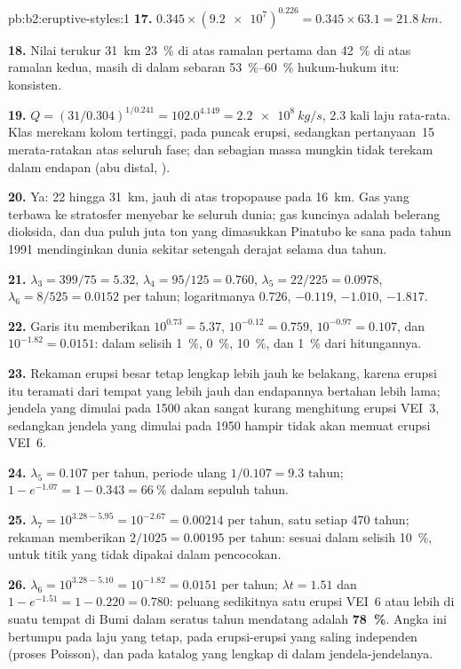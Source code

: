 \begin{solution}{pb:b2:eruptive-styles:1}
\textbf{17.} $0.345\times(\num{9.2e7})^{0.226} = 0.345\times63.1 = \qty{21.8}{km}$.

\textbf{18.} Nilai terukur \qty{31}{km} \qty{23}{\percent} di atas ramalan
pertama dan \qty{42}{\percent} di atas ramalan kedua, masih di dalam sebaran
\qtyrange{53}{60}{\percent} hukum-hukum itu: konsisten.

\textbf{19.} $Q = (31/0.304)^{1/0.241} = 102.0^{4.149} = \qty{2.2e8}{kg/s}$, 2.3 kali
laju rata-rata. Klas merekam kolom tertinggi, pada puncak
erupsi, sedangkan pertanyaan~15 merata-ratakan atas seluruh fase; dan sebagian massa
mungkin tidak terekam dalam endapan (abu distal, ).

\textbf{20.} Ya: 22 hingga \qty{31}{km}, jauh di atas tropopause pada \qty{16}{km}.
Gas yang terbawa ke stratosfer menyebar ke seluruh dunia; gas kuncinya adalah
belerang dioksida, dan dua puluh juta ton yang dimasukkan Pinatubo ke sana pada tahun 1991
mendinginkan dunia sekitar setengah derajat selama dua tahun.

\textbf{21.} $\lambda_3 = 399/75 = 5.32$, $\lambda_4 = 95/125 = 0.760$, $\lambda_5 = 22/225 =
0.0978$, $\lambda_6 = 8/525 = 0.0152$ per tahun; logaritmanya $0.726$, $-0.119$, $-1.010$,
$-1.817$.

\textbf{22.} Garis itu memberikan $10^{0.73} = 5.37$, $10^{-0.12} = 0.759$, $10^{-0.97} =
0.107$, dan $10^{-1.82} = 0.0151$: dalam selisih \qty{1}{\percent}, \qty{0}{\percent},
\qty{10}{\percent}, dan \qty{1}{\percent} dari hitungannya.

\textbf{23.} Rekaman erupsi besar tetap lengkap lebih jauh ke belakang,
karena erupsi itu teramati dari tempat yang lebih jauh dan endapannya bertahan lebih lama; jendela
yang dimulai pada 1500 akan sangat kurang menghitung erupsi VEI~3, sedangkan jendela
yang dimulai pada 1950 hampir tidak akan memuat erupsi VEI~6.

\textbf{24.} $\lambda_5 = \num{0.107}$ per tahun, periode ulang $1/0.107 =
\num{9.3}\text{ tahun}$; $1 - e^{-1.07} = 1 - 0.343 = \qty{66}{\percent}$ dalam sepuluh tahun.

\textbf{25.} $\lambda_7 = 10^{3.28 - 5.95} = 10^{-2.67} = 0.00214$ per tahun, satu setiap
470 tahun; rekaman memberikan $2/1025 = 0.00195$ per tahun: sesuai dalam selisih
\qty{10}{\percent}, untuk titik yang tidak dipakai dalam pencocokan.

\textbf{26.} $\lambda_6 = 10^{3.28 - 5.10} = 10^{-1.82} = 0.0151$ per tahun; $\lambda t = 1.51$
dan $1 - e^{-1.51} = 1 - 0.220 = 0.780$: peluang sedikitnya satu erupsi
VEI~6 atau lebih di suatu tempat di Bumi dalam seratus tahun mendatang adalah
\textbf{\qty[text-series-to-math=true]{78}{\percent}}. Angka ini bertumpu pada laju yang tetap,
pada erupsi-erupsi yang saling independen (proses Poisson), dan pada
katalog yang lengkap di dalam jendela-jendelanya.
\end{solution}
